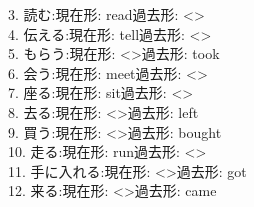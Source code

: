 \documentclass[uplatex,
paper=a4,
fontsize=18pt,
jafontsize=16pt,
number_of_lines=30,
line_length=30zh,
baselineskip=25pt,
]{jlreq}
\begin{document}
3.  読む:\hspace{2em}現在形: read\hspace{2em}過去形: <\hspace{3em}>
\\

4.  伝える:\hspace{2em}現在形: tell\hspace{2em}過去形: <\hspace{3em}>
\\

5.  もらう:\hspace{2em}現在形: <\hspace{3em}>\hspace{2em}過去形: took
\\

6.  会う:\hspace{2em}現在形: meet\hspace{2em}過去形: <\hspace{3em}>
\\

7.  座る:\hspace{2em}現在形: sit\hspace{2em}過去形: <\hspace{3em}>
\\

8.  去る:\hspace{2em}現在形: <\hspace{3em}>\hspace{2em}過去形: left
\\

9.  買う:\hspace{2em}現在形: <\hspace{3em}>\hspace{2em}過去形: bought
\\

10.  走る:\hspace{2em}現在形: run\hspace{2em}過去形: <\hspace{3em}>
\\

11.  手に入れる:\hspace{2em}現在形: <\hspace{3em}>\hspace{2em}過去形: got
\\

12.  来る:\hspace{2em}現在形: <\hspace{3em}>\hspace{2em}過去形: came
\\
\end{document}
